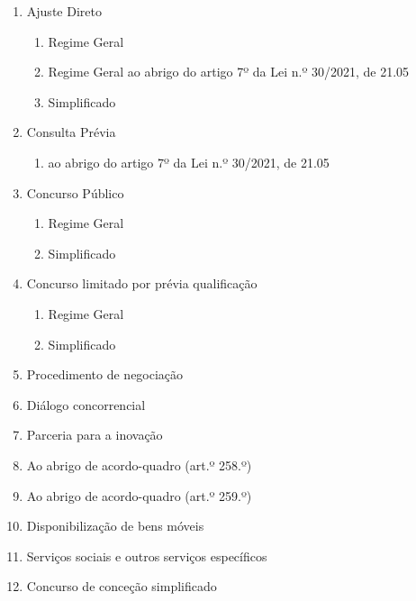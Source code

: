 \begin{enumerate}
	\setlength\itemsep{.01cm}
	
	\item Ajuste Direto
	\begin{enumerate}
		\setlength\itemsep{.01cm}
		\item Regime Geral
		\item Regime Geral ao abrigo do artigo 7º da Lei n.º 30/2021, de 21.05
		\item Simplificado
	\end{enumerate}
	
	\item Consulta Prévia
	\begin{enumerate}
		\setlength\itemsep{.01cm}
		\item ao abrigo do artigo 7º da Lei n.º 30/2021, de 21.05
	\end{enumerate}
	
	\item Concurso Público
	\begin{enumerate}
		\setlength\itemsep{.01cm}
		\item Regime Geral
		\item Simplificado
	\end{enumerate}
	
	\item Concurso limitado por prévia qualificação
	\begin{enumerate}
		\setlength\itemsep{.01cm}
		\item Regime Geral
		\item Simplificado
	\end{enumerate}
	
	\item Procedimento de negociação
	
	\item Diálogo concorrencial
	
	\item Parceria para a inovação
	
	\item Ao abrigo de acordo-quadro (art.º 258.º) 

	\item Ao abrigo de acordo-quadro (art.º 259.º)
		
	\item Disponibilização de bens móveis	
	
	\item Serviços sociais e outros serviços específicos
	
	\item Concurso de conceção simplificado
	
\end{enumerate}


